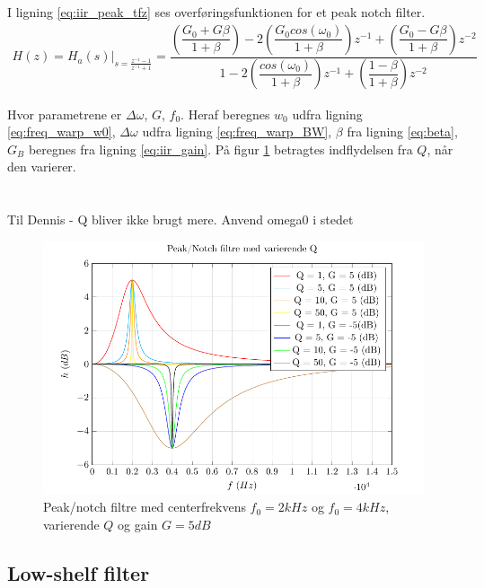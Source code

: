     I ligning \ref{eq:iir_peak_tfz} ses overføringsfunktionen for et peak notch filter.
   \begin{align}
    H(z) = H_a(s)\bigg|_{s = \frac{z^{-1} -1 }{z^{-1} + 1}} = 
    \dfrac{\left(\dfrac{G_0 + G \beta}{1 + \beta} \right)- 2 \left(\dfrac{G_0 cos( \omega_0)}{1 +\beta} \right)z^{-1} + \left(\dfrac{ G_0 - G \beta}{1 + \beta }\right) z^{-2}}{1 - 2 \left(\dfrac{cos(\omega_0)}{1 + \beta}\right)z^{-1} + \left( \dfrac{1 - \beta}{1 + \beta} \right) z^{-2}}
    \label{eq:iir_peak_tfz}
   \end{align}

   Hvor parametrene er $\Delta \omega$, $G$, $f_0$. Heraf beregnes $w_0$ udfra ligning \ref{eq:freq_warp_w0}, $\Delta \omega$ udfra ligning \ref{eq:freq_warp_BW}, $\beta$ fra ligning \ref{eq:beta}, $G_B$ beregnes fra ligning \ref{eq:iir_gain}.
   På figur \ref{fig:iir_peak} betragtes indflydelsen fra $Q$, når den varierer.
   \\ \\ \\
Til Dennis - Q bliver ikke brugt mere. Anvend omega0 i stedet
\\
 \begin{figure}
    \centering
         \includegraphics{figure/iir_peak.pdf}
        \caption{Peak/notch filtre med centerfrekvens $f_0 = 2kHz$ og $f_0 = 4kHz$, varierende $Q$ og gain $G=5dB$}
        \label{fig:iir_peak}   
    \end{figure} 
\FloatBlock

     \subsection{Low-shelf filter}


